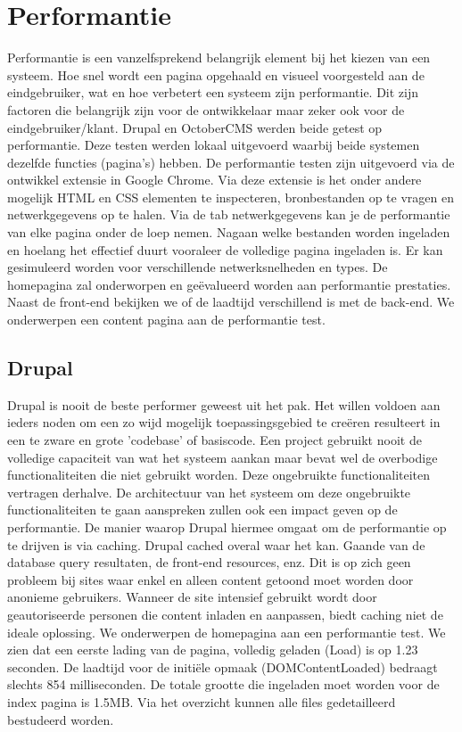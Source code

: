 \section{Performantie}
Performantie is een vanzelfsprekend belangrijk element bij het kiezen van een systeem. Hoe snel wordt een pagina opgehaald en visueel voorgesteld aan de eindgebruiker, wat en hoe verbetert een systeem zijn performantie. Dit zijn factoren die belangrijk zijn voor de ontwikkelaar maar zeker ook voor de eindgebruiker/klant.
\newline\newline
Drupal en OctoberCMS werden beide getest op performantie. Deze testen werden lokaal uitgevoerd waarbij beide systemen dezelfde functies (pagina's) hebben. De performantie testen zijn uitgevoerd via de ontwikkel extensie in Google Chrome. Via deze extensie is het onder andere mogelijk HTML en CSS elementen te inspecteren, bronbestanden op te vragen en netwerkgegevens op te halen. Via de tab netwerkgegevens kan je de performantie van elke pagina onder de loep nemen. Nagaan welke bestanden worden ingeladen en hoelang het effectief duurt vooraleer de volledige pagina ingeladen is. Er kan gesimuleerd worden voor verschillende netwerksnelheden en types. De homepagina zal onderworpen en geëvalueerd worden aan performantie prestaties. Naast de front-end bekijken we of de laadtijd verschillend is met de back-end. We onderwerpen een content pagina aan de performantie test.

\subsection{Drupal}
Drupal is nooit de beste performer geweest uit het pak. Het willen voldoen aan ieders noden om een zo wijd mogelijk toepassingsgebied te creëren resulteert in een te zware en grote 'codebase' of basiscode. Een project gebruikt nooit de volledige capaciteit van wat het systeem aankan maar bevat wel de overbodige functionaliteiten die niet gebruikt worden. Deze ongebruikte functionaliteiten vertragen derhalve. De architectuur van het systeem om deze ongebruikte functionaliteiten te gaan aanspreken zullen ook een impact geven op de performantie. 
\newline\newline
De manier waarop Drupal hiermee omgaat om de performantie op te drijven is via caching. Drupal cached overal waar het kan. Gaande van de database query resultaten, de front-end resources, enz. Dit is op zich geen probleem bij sites waar enkel en alleen content getoond moet worden door anonieme gebruikers. Wanneer de site intensief gebruikt wordt door geautoriseerde personen die content inladen en aanpassen, biedt caching niet de ideale oplossing.
\newline\newline
We onderwerpen de homepagina aan een performantie test. We zien dat een eerste lading van de pagina, volledig geladen (Load) is op 1.23 seconden. De laadtijd voor de initiële opmaak (DOMContentLoaded) bedraagt slechts 854 milliseconden. De totale grootte die ingeladen moet worden voor de index pagina is 1.5MB. Via het overzicht kunnen alle files gedetailleerd bestudeerd worden.

